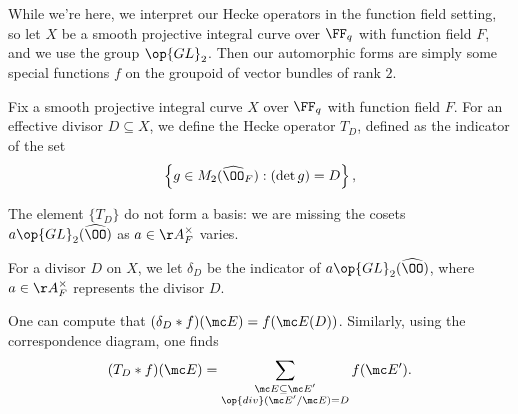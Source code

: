 \documentclass[../notes.tex]{subfiles}
\begin{document}
While we're here, we interpret our Hecke operators in the function field setting, so let $X$ be a smooth projective integral curve over $\FF_q$ with function field $F$, and we use the group $\op{GL}_2$. Then our automorphic forms are simply some special functions $f$ on the groupoid of vector bundles of rank $2$.
\begin{notation}
	Fix a smooth projective integral curve $X$ over $\FF_q$ with function field $F$. For an effective divisor $D\subseteq X$, we define the Hecke operator $T_D$, defined as the indicator of the set
	\[\left\{g\in M_2(\widehat\OO_F):(\det g)=D\right\},\]
\end{notation}
\begin{remark}
	The element $\{T_D\}$ do not form a basis: we are missing the cosets $a\op{GL}_2(\widehat\OO)$ as $a\in\AA_F^\times$ varies.
\end{remark}
\begin{notation}
	For a divisor $D$ on $X$, we let $\delta_D$ be the indicator of $a\op{GL}_2(\widehat\OO)$, where $a\in\AA_F^\times$ represents the divisor $D$.
\end{notation}
\begin{remark}
	One can compute that $(\delta_D*f)(\mc E)=f(\mc E(D))$. Similarly, using the correspondence diagram, one finds
	\[(T_D*f)(\mc E)=\sum_{\substack{\mc E\subseteq\mc E'\\\op{div}(\mc E'/\mc E)=D}}f(\mc E').\]
\end{remark}
\end{document}
